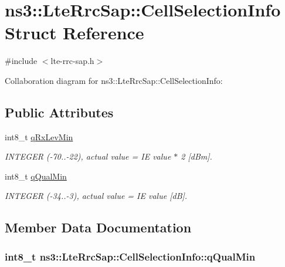 \hypertarget{structns3_1_1LteRrcSap_1_1CellSelectionInfo}{}\section{ns3\+:\+:Lte\+Rrc\+Sap\+:\+:Cell\+Selection\+Info Struct Reference}
\label{structns3_1_1LteRrcSap_1_1CellSelectionInfo}


{\ttfamily \#include $<$lte-\/rrc-\/sap.\+h$>$}



Collaboration diagram for ns3\+:\+:Lte\+Rrc\+Sap\+:\+:Cell\+Selection\+Info\+:
\subsection*{Public Attributes}
\begin{DoxyCompactItemize}
\item 
int8\+\_\+t \hyperlink{structns3_1_1LteRrcSap_1_1CellSelectionInfo_a6827f809e7596ce3eb122d5cc7b5b881}{q\+Rx\+Lev\+Min}
\begin{DoxyCompactList}\small\item\em I\+N\+T\+E\+G\+ER (-\/70..-\/22), actual value = IE value $\ast$ 2 \mbox{[}d\+Bm\mbox{]}. \end{DoxyCompactList}\item 
int8\+\_\+t \hyperlink{structns3_1_1LteRrcSap_1_1CellSelectionInfo_abcea30eae211402ef4defae3f05477cf}{q\+Qual\+Min}
\begin{DoxyCompactList}\small\item\em I\+N\+T\+E\+G\+ER (-\/34..-\/3), actual value = IE value \mbox{[}dB\mbox{]}. \end{DoxyCompactList}\end{DoxyCompactItemize}


\subsection{Member Data Documentation}
\subsubsection[{\texorpdfstring{q\+Qual\+Min}{qQualMin}}]{\setlength{\rightskip}{0pt plus 5cm}int8\+\_\+t ns3\+::\+Lte\+Rrc\+Sap\+::\+Cell\+Selection\+Info\+::q\+Qual\+Min}\hypertarget{structns3_1_1LteRrcSap_1_1CellSelectionInfo_abcea30eae211402ef4defae3f05477cf}{}\label{structns3_1_1LteRrcSap_1_1CellSelectionInfo_abcea30eae211402ef4defae3f05477cf}


